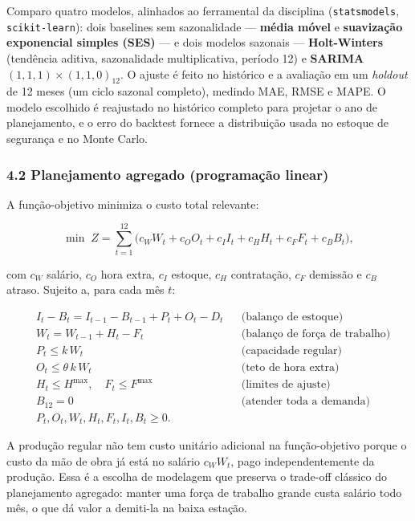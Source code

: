 \documentclass[
  brazilian,
  12pt,
]{article}
\begin{document}
Comparo quatro modelos, alinhados ao ferramental da disciplina
(\texttt{statsmodels}, \texttt{scikit-learn}): dois baselines sem
sazonalidade --- \textbf{média móvel} e \textbf{suavização exponencial
simples (SES)} --- e dois modelos sazonais --- \textbf{Holt-Winters}
(tendência aditiva, sazonalidade multiplicativa, período 12) e
\textbf{SARIMA} \((1,1,1)\times(1,1,0)_{12}\). O ajuste é feito no
histórico e a avaliação em um \emph{holdout} de 12 meses (um ciclo
sazonal completo), medindo MAE, RMSE e MAPE. O modelo escolhido é
reajustado no histórico completo para projetar o ano de planejamento, e
o erro do backtest fornece a distribuição usada no estoque de segurança
e no Monte Carlo.

\subsubsection{4.2 Planejamento agregado (programação
linear)}\label{planejamento-agregado-programauxe7uxe3o-linear}

A função-objetivo minimiza o custo total relevante:

\[\min \; Z = \sum_{t=1}^{12} \Big( c_W W_t + c_O O_t + c_I I_t + c_H H_t + c_F F_t + c_B B_t \Big),\]

com \(c_W\) salário, \(c_O\) hora extra, \(c_I\) estoque, \(c_H\)
contratação, \(c_F\) demissão e \(c_B\) atraso. Sujeito a, para cada mês
\(t\):

\[
\begin{aligned}
& I_t - B_t = I_{t-1} - B_{t-1} + P_t + O_t - D_t && \text{(balanço de estoque)}\\
& W_t = W_{t-1} + H_t - F_t && \text{(balanço de força de trabalho)}\\
& P_t \le k\,W_t && \text{(capacidade regular)}\\
& O_t \le \theta\,k\,W_t && \text{(teto de hora extra)}\\
& H_t \le H^{\max}, \quad F_t \le F^{\max} && \text{(limites de ajuste)}\\
& B_{12} = 0 && \text{(atender toda a demanda)}\\
& P_t, O_t, W_t, H_t, F_t, I_t, B_t \ge 0.
\end{aligned}
\]

A produção regular não tem custo unitário adicional na função-objetivo
porque o custo da mão de obra já está no salário \(c_W W_t\), pago
independentemente da produção. Essa é a escolha de modelagem que
preserva o trade-off clássico do planejamento agregado: manter uma força
de trabalho grande custa salário todo mês, o que dá valor a demiti-la na
baixa estação.
\end{document}
